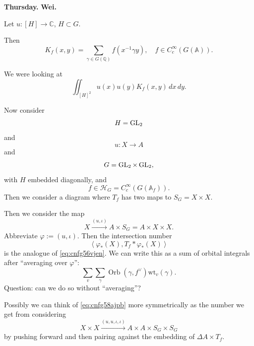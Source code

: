 \documentclass[reqno]{amsart} 
\begin{document}
\textbf{Thursday.}
\textbf{Wei.}

Let $u : [H] \rightarrow \mathbb{C}$, $H \subset G$.

Then
\begin{equation*}
K_f(x, y) = \sum_{\gamma \in G(\mathbb{Q})} f(x^{-1} \gamma y), \quad f \in C_c^\infty(G(\mathbb{A})).
\end{equation*}

We were looking at
\begin{equation}\label{eq:cnfg56vjen}
\iint_{[H]^2} u(x) u(y) K_f(x, y) \, d x \, d y.
\end{equation}

Now consider
\begin{equation*}
H = \operatorname{GL}_2
\end{equation*}
and
\begin{equation*}
u : X \rightarrow A
\end{equation*}
and
\begin{equation*}
G = \operatorname{GL}_2 \times \operatorname{GL}_2,
\end{equation*}
with $H$ embedded diagonally, and
\begin{equation*}
f \in \mathcal{H}_G = C_c^\infty(G(\mathbb{A}_f)).
\end{equation*}
Then we consider a diagram where $T_f$ has two maps to $S_G = X \times X$.

Then we consider the map
\begin{equation*}
X \xrightarrow{(u, \iota)} A \times S_G = A \times X \times X.
\end{equation*}
Abbreviate $\varphi :=(u, \iota)$.  Then the intersection number
\begin{equation}\label{eq:cnfg58ajpb}
\left\langle \varphi _\ast(X), T_f \ast \varphi _\ast(X) \right\rangle
\end{equation}
is the analogue of \eqref{eq:cnfg56vjen}.  We can write this as a sum of orbital integrals after ``averaging over $\varphi$'':
\begin{equation*}
\sum_v \sum_\gamma \operatorname{Orb}(\gamma, f^\vee) \mathrm{wt}_v(\gamma).
\end{equation*}
Question: can we do so without ``averaging''?

Possibly we can think of \eqref{eq:cnfg58ajpb} more symmetrically as the number we get from considering
\begin{equation*}
  X \times X \xrightarrow{(u,u,\iota,\iota)}
  A \times A \times S_G \times S_G
\end{equation*}
by pushing forward and then pairing against the embedding of $\Delta A \times T_f$.
\end{document}
